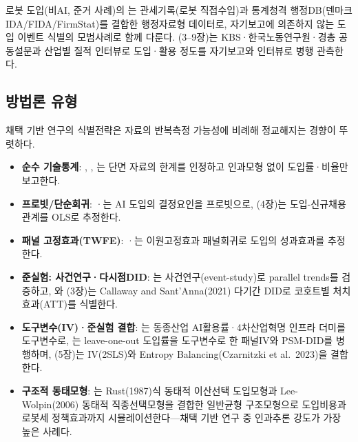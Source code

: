 \documentclass[11pt]{article}
\begin{document}
로봇 도입(비AI, 준거 사례)의 \citet{humlum-2019-robot-adoption-and-labor-market}는 관세기록(로봇 직접수입)과 통계청격 행정DB(덴마크 IDA/FIDA/FirmStat)를 결합한 행정자료형 데이터로, 자기보고에 의존하지 않는 도입 이벤트 식별의 모범사례로 함께 다룬다. \citet{noh-2025-ai-labor-coexistence}(3--9장)는 KBS·한국노동연구원·경총 공동설문과 산업별 질적 인터뷰로 도입·활용 정도를 자기보고와 인터뷰로 병행 관측한다.

\subsection{방법론 유형}

채택 기반 연구의 식별전략은 자료의 반복측정 가능성에 비례해 정교해지는 경향이 뚜렷하다.

\begin{itemize}[leftmargin=*]
  \item \textbf{순수 기술통계}: \citet{kim-2021-ai-adoption-status-major-industries}, \citet{spri-2024-ai-industry-survey}, \citet{seo-2025-ai-adoption-characteristics-business-reports}는 단면 자료의 한계를 인정하고 인과모형 없이 도입률·비율만 보고한다.
  \item \textbf{프로빗/단순회귀}: \citet{kiet-2021-ai-adoption-productivity}·\citet{kiet-2024-ai-adoption-firms-policy}는 AI 도입의 결정요인을 프로빗으로, \citet{chang-2024-ai-development-employment-effects}(4장)는 도입-신규채용 관계를 OLS로 추정한다.
  \item \textbf{패널 고정효과(TWFE)}: \citet{kiet-2024-ai-adoption-firms-policy}·\citet{kim-2025-ai-adoption-firm-performance}는 이원고정효과 패널회귀로 도입의 성과효과를 추정한다.
  \item \textbf{준실험: 사건연구·다시점DID}: \citet{kim-2025-ai-adoption-firm-performance}는 사건연구(event-study)로 parallel trends를 검증하고, \citet{lee-2025-ai-adoption-determinants-performance}와 \citet{kiet-2024-ai-labor-market-industry}(3장)는 Callaway and Sant'Anna(2021) 다기간 DID로 코호트별 처치효과(ATT)를 식별한다.
  \item \textbf{도구변수(IV)·준실험 결합}: \citet{kiet-2021-ai-adoption-productivity}는 동종산업 AI활용률·4차산업혁명 인프라 더미를 도구변수로, \citet{nam-2026-ai-macroeconomic-impact-analysis}는 leave-one-out 도입률을 도구변수로 한 패널IV와 PSM-DID를 병행하며, \citet{chang-2024-ai-development-employment-effects}(5장)는 IV(2SLS)와 Entropy Balancing(Czarnitzki et al.\ 2023)을 결합한다.
  \item \textbf{구조적 동태모형}: \citet{humlum-2019-robot-adoption-and-labor-market}는 Rust(1987)식 동태적 이산선택 도입모형과 Lee-Wolpin(2006) 동태적 직종선택모형을 결합한 일반균형 구조모형으로 도입비용과 로봇세 정책효과까지 시뮬레이션한다—채택 기반 연구 중 인과추론 강도가 가장 높은 사례다.

\end{itemize}
\end{document}
